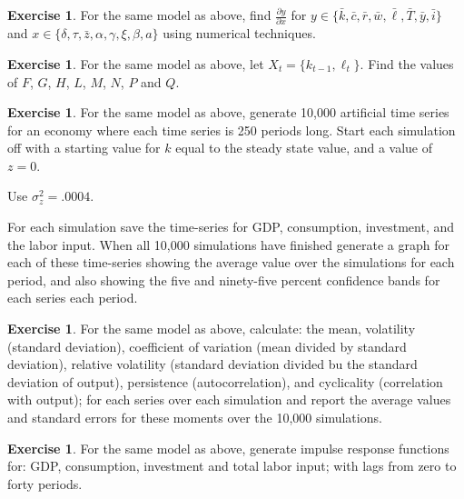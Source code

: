 \documentclass[letterpaper,12pt]{article}
\theoremstyle{definition}
\newtheorem{exercise}[theorem]{Exercise}
\begin{document}
\begin{spacing}{1.5}
	\begin{exercise} \label{Linear_HW_Base_Numer_Deriv}
		For the same model as above, find $\frac{\partial y}{\partial x}$ for $y\in\{\bar k, \bar c, \bar r, \bar w, \bar \ell, \bar T, \bar y, \bar i\}$ and $x\in\{\delta, \tau, \bar z, \alpha, \gamma, \xi, \beta, a \}$ using numerical techniques.
	\end{exercise}

	\begin{exercise} \label{Linear_HW_Base_Coeffs}
		For the same model as above, let $X_t = \{k_{t-1}, \ell_t\}$.  Find the values of $F$, $G$, $H$, $L$, $M$, $N$, $P$ and $Q$.
	\end{exercise}

	\begin{exercise} \label{Linear_HW_Base_Sims}
		For the same model as above, generate 10,000 artificial time series for an economy where each time series is 250 periods long.  Start each simulation off with a starting value for $k$ equal to the steady state value, and a value of $z=0$.

		Use $\sigma_z^2 = .0004$.

		For each simulation save the time-series for GDP, consumption, investment, and the labor input.  When all 10,000 simulations have finished generate a graph for each of these time-series showing the average value over the simulations for each period, and also showing the five and ninety-five percent confidence bands for each series each period.
	\end{exercise}

	\begin{exercise} \label{Linear_HW_Base_Moments}
		For the same model as above, calculate: the mean, volatility (standard deviation), coefficient of variation (mean divided by standard deviation), relative volatility (standard deviation divided bu the standard deviation of output), persistence (autocorrelation), and cyclicality (correlation with output); for each series over each simulation and report the average values and standard errors for these moments over the 10,000 simulations.
	\end{exercise}

	\begin{exercise} \label{Linear_HW_Base_IRFs}
		For the same model as above, generate impulse response functions for: GDP, consumption, investment and total labor input; with lags from zero to forty periods.
	\end{exercise}


\end{spacing}
\end{document}

